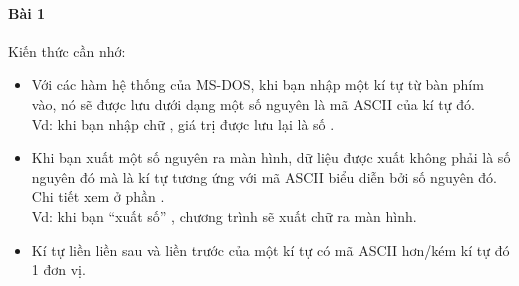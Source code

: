 \documentclass[main.tex]{subfiles}
\begin{document}
\paragraph*{Bài 1}
Kiến thức cần nhớ:
\begin{itemize}
    \item Với các hàm hệ thống của MS-DOS, khi bạn nhập một kí tự từ bàn phím vào, nó sẽ được lưu dưới dạng một số nguyên là mã ASCII của kí tự đó.\\
        Vd: khi bạn nhập chữ , giá trị được lưu lại là số .
    \item Khi bạn xuất một số nguyên ra màn hình, dữ liệu được xuất không phải là số nguyên đó mà là kí tự tương ứng với mã ASCII biểu diễn bởi số nguyên đó. Chi tiết xem ở phần .\\
        Vd: khi bạn ``xuất số'' , chương trình sẽ xuất chữ  ra màn hình.
    \item Kí tự liền liền sau và liền trước của một kí tự có mã ASCII hơn/kém kí tự đó 1 đơn vị.
\end{itemize}

\inputminted[linenos,breaklines]{nasm}{answer_source/Bai1.asm}
\end{document}
